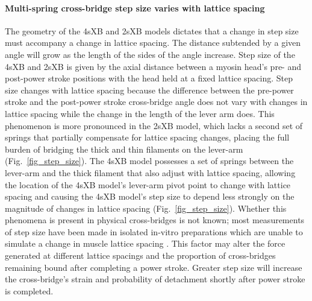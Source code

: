 \documentclass[10pt]{article}
\newcommand{\citep}[1]{\cite{#1}} %
\begin{document}
\paragraph{Multi-spring cross-bridge step size varies with lattice spacing} %
The geometry of the 4sXB and 2sXB models dictates that a change in step size must accompany a change in lattice spacing. 
The distance subtended by a given angle will grow as the length of the sides of the angle increase. 
Step size of the 4sXB and 2sXB is given by the axial distance between a myosin head's pre- and post-power stroke positions with the head held at a fixed lattice spacing. 
Step size changes with lattice spacing because the difference between the pre-power stroke and the post-power stroke cross-bridge angle does not vary with changes in lattice spacing while the change in the length of the lever arm does. 
This phenomenon is more pronounced in the 2sXB model, which lacks a second set of springs that partially compensate for lattice spacing changes, placing the full burden of bridging the thick and thin filaments on the lever-arm (Fig.~\ref{fig_step_size}). 
The 4sXB model possesses a set of springs between the lever-arm and the thick filament that also adjust with lattice spacing, allowing the location of the 4sXB model's lever-arm pivot point to change with lattice spacing and causing the 4sXB model's step size to depend less strongly on the magnitude of changes in lattice spacing (Fig.~\ref{fig_step_size}).  
Whether this phenomena is present in physical cross-bridges is not known; most measurements of step size have been made in isolated in-vitro preparations which are unable to simulate a change in muscle lattice spacing \citep{HowardBook, Peterman2004}.  
This factor may alter the force generated at different lattice spacings and the proportion of cross-bridges remaining bound after completing a power stroke.
Greater step size will increase the cross-bridge's strain and probability of detachment shortly after power stroke is completed. 
\end{document}
